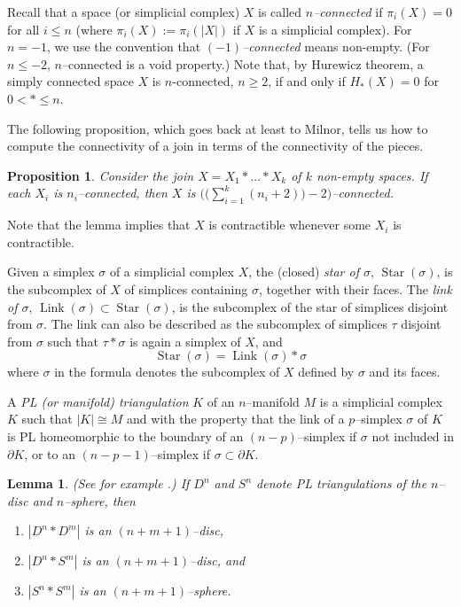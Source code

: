 \documentclass[10pt]{amsart}
\newtheorem{lem}[thm]{Lemma}
\newtheorem{prop}[thm]{Proposition}
\newcommand{\s}{\sigma}
\newcommand{\del}{\partial}
\newcommand{\link}{\operatorname{Link}}
\newcommand{\Star}{\operatorname{Star}}
\begin{document}
\medskip



Recall that a space (or simplicial complex) $X$ is called {\em $n$--connected} if $\pi_i(X)=0$ for all $i\le n$ (where
$\pi_i(X):=\pi_i(|X|)$ if $X$ is a simplicial complex). For $n=-1$, we use the convention that {\em $(-1)$--connected} means
non-empty. (For $n\le -2$, $n$--connected is a void property.) 
Note that, by Hurewicz theorem, a simply connected space $X$ is $n$-connected, $n\ge 2$, if and only if $H_*(X)=0$ for $0<*\le n$. 

The following proposition, which goes back at least to Milnor, tells us how to compute the connectivity of a join in
terms of the connectivity of the pieces. 


\begin{prop}\cite[Lem 2.3]{Mil}\label{joinconn}
Consider the join $X=X_1*\dots*X_k$ of $k$ non-empty spaces. If each $X_i$ is $n_i$--connected, then $X$ is 
$\big(\big(\sum_{i=1}^k(n_i+2)\big)-2\big)$--connected. 
\end{prop}

Note that the lemma implies that $X$ is contractible whenever some $X_i$ is contractible. 






\medskip


Given a simplex $\s$ of a simplicial complex $X$, the (closed) {\em star of $\s$}, $\Star(\s)$, 
is the subcomplex of $X$ of simplices containing $\s$, together with their faces. 
The {\em link of $\s$}, $\link(\s)\subset \Star(\s)$, is the subcomplex of the star of simplices disjoint from $\s$. 
The link can also be described as the subcomplex of simplices $\tau$ disjoint from $\s$ such that $\tau*\s$ is again a simplex of
$X$, and 
 $$\Star(\s)=\link(\s)*\s$$
where $\s$ in the formula denotes the subcomplex of $X$ defined by $\s$ and its faces. 

\medskip

A {\em PL (or manifold) triangulation} $K$ of an $n$--manifold $M$ 
is a simplicial complex $K$ such that $|K|\cong M$ and with the
property that the link of a $p$--simplex $\s$ of $K$ is PL homeomorphic to the boundary of an $(n-p)$--simplex 
if $\s$ not included in $\del K$, 
 or to an $(n-p-1)$--simplex if $\s\subset \del K$.  



\begin{lem}\label{links}(See for example \cite[Lem 1.13]{Hu}\label{D*S}.)
If $D^n$ and $S^n$ denote PL triangulations of the $n$--disc and $n$--sphere, then 
\begin{enumerate}[$(i)$]
\item $|D^n*D^m|$ is an $(n+m+1)$--disc,
\item $|D^n*S^m|$ is an $(n+m+1)$--disc, and 
\item $|S^n*S^m|$ is an $(n+m+1)$--sphere. 
\end{enumerate}
\end{lem}
\end{document}
